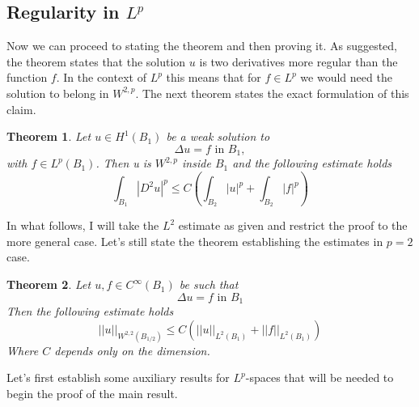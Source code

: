 \documentclass[12pt]{artikel1}
\newtheorem{theorem}{Theorem}[section]
\begin{document}
\subsection*{Regularity in $L^p$}

Now we can proceed to stating the theorem and then proving it. As suggested, the theorem states that the solution $u$ is two derivatives more regular than the function $f$. In the context of $L^p$ this means that for $f\in L^p$ we would need the solution to belong in $W^{2,p}$. The next theorem states the exact formulation of this claim.

\begin{theorem}\label{thm:main}
    Let $u\in H^1(B_1)$ be a weak solution to
    \begin{equation*}
        \Delta u=f\text{ in }B_1,
    \end{equation*}
    with $f\in L^p(B_1)$. Then u is $W^{2,p}$ inside $B_1$ and the following estimate holds
    \begin{equation*}
        \int_{B_1}|D^2u|^p\leq C\left(\int_{B_2}|u|^p+\int_{B_2}|f|^p\right)
    \end{equation*}
\end{theorem}

In what follows, I will take the $L^2$ estimate as given and restrict the proof to the more general case. Let's still state the theorem establishing the estimates in $p=2$ case.

\begin{theorem}\label{thm:L2}
    Let $u,f\in C^{\infty}(B_1)$ be such that
    \begin{equation*}
        \Delta u=f\text{ in }B_1
    \end{equation*}
    Then the following estimate holds
    \begin{equation*}
        ||u||_{W^{2,2}(B_{1/2})}\leq C\left(||u||_{L^2(B_1)}+||f||_{L^2(B_1)}\right)
    \end{equation*}
    Where $C$ depends only on the dimension.
\end{theorem}

Let's first establish some auxiliary results for $L^p$-spaces that will be needed to begin the proof of the main result. 
\end{document}
